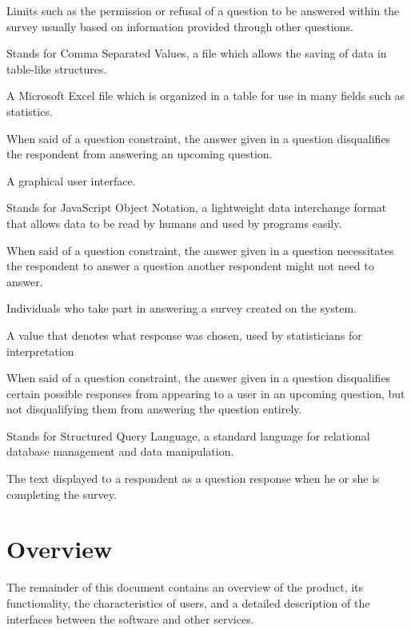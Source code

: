 \documentclass[10pt,letter]{report}
\newenvironment{defns}{
  \begin{description}
    \newcommand{\defn}[2]{\item[##1] ##2}
  }
  {
    \end{description}
  }
\begin{document}
\begin{defns}
   \defn{Constraints}{Limits such as the permission or refusal of a
     question to be answered within the survey usually based on
     information provided through other questions.}
  \defn{CSV}{Stands for Comma Separated Values, a file which allows
    the saving of data in table-like structures.}
  \defn{Excel}{A Microsoft Excel file which is organized in a table
    for use in many fields such as statistics.}
  \defn{Forbids}{When said of a question constraint, the answer given
    in a question disqualifies the respondent from answering an
    upcoming question.}
  \defn{Frontend}{A graphical user interface.}
  \defn{JSON}{Stands for JavaScript Object Notation, a lightweight
    data interchange format that allows data to be read by humans and
    used by programs easily.}
  \defn{Requires}{When said of a question constraint, the answer given
    in a question necessitates the respondent to answer a question another
    respondent might not need to answer.}
  \defn{Respondents}{Individuals who take part in answering a survey
    created on the system.}
  \defn{Response Value}{A value that denotes what response was chosen,
    used by statisticians for interpretation}
  \defn{Restricts}{When said of a question constraint, the answer given in a
    question disqualifies certain possible responses from appearing
     to a user in an upcoming question, but not disqualifying them
     from answering the question entirely.}
  \defn{SQL}{Stands for Structured Query Language, a standard language
    for relational database management and data manipulation.}
  \defn{User Response Text}{The text displayed to a respondent as a
    question response when he or she is completing the survey.}

\end{defns}


\section{Overview}
\label{sec:overview}

The remainder of this document contains an overview of the product,
its functionality, the characteristics of users, and a detailed
description of the interfaces between the software and other services.
\end{document}
